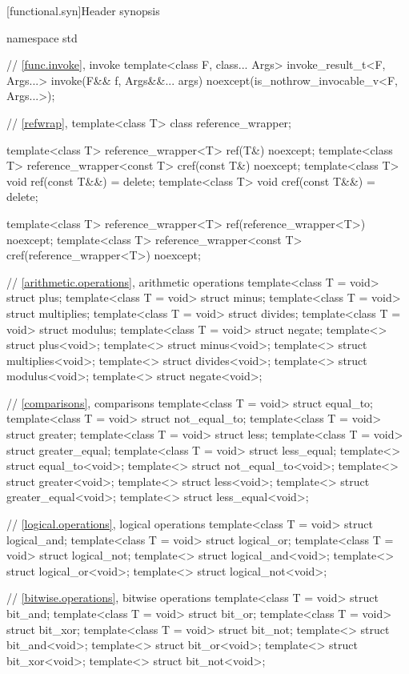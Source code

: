 [functional.syn]{Header  synopsis}

%
\begin{codeblock}
namespace std {
  // \ref{func.invoke}, invoke
  template<class F, class... Args>
    invoke_result_t<F, Args...> invoke(F&& f, Args&&... args)
      noexcept(is_nothrow_invocable_v<F, Args...>);

  // \ref{refwrap}, 
  template<class T> class reference_wrapper;

  template<class T> reference_wrapper<T> ref(T&) noexcept;
  template<class T> reference_wrapper<const T> cref(const T&) noexcept;
  template<class T> void ref(const T&&) = delete;
  template<class T> void cref(const T&&) = delete;

  template<class T> reference_wrapper<T> ref(reference_wrapper<T>) noexcept;
  template<class T> reference_wrapper<const T> cref(reference_wrapper<T>) noexcept;

  // \ref{arithmetic.operations}, arithmetic operations
  template<class T = void> struct plus;
  template<class T = void> struct minus;
  template<class T = void> struct multiplies;
  template<class T = void> struct divides;
  template<class T = void> struct modulus;
  template<class T = void> struct negate;
  template<> struct plus<void>;
  template<> struct minus<void>;
  template<> struct multiplies<void>;
  template<> struct divides<void>;
  template<> struct modulus<void>;
  template<> struct negate<void>;

  // \ref{comparisons}, comparisons
  template<class T = void> struct equal_to;
  template<class T = void> struct not_equal_to;
  template<class T = void> struct greater;
  template<class T = void> struct less;
  template<class T = void> struct greater_equal;
  template<class T = void> struct less_equal;
  template<> struct equal_to<void>;
  template<> struct not_equal_to<void>;
  template<> struct greater<void>;
  template<> struct less<void>;
  template<> struct greater_equal<void>;
  template<> struct less_equal<void>;

  // \ref{logical.operations}, logical operations
  template<class T = void> struct logical_and;
  template<class T = void> struct logical_or;
  template<class T = void> struct logical_not;
  template<> struct logical_and<void>;
  template<> struct logical_or<void>;
  template<> struct logical_not<void>;

  // \ref{bitwise.operations}, bitwise operations
  template<class T = void> struct bit_and;
  template<class T = void> struct bit_or;
  template<class T = void> struct bit_xor;
  template<class T = void> struct bit_not;
  template<> struct bit_and<void>;
  template<> struct bit_or<void>;
  template<> struct bit_xor<void>;
  template<> struct bit_not<void>;

}
\end{codeblock}
